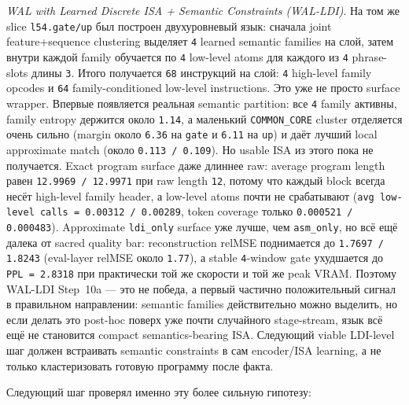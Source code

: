 \begin{itemize}[leftmargin=1.5em]
\emph{WAL with Learned Discrete ISA + Semantic Constraints (WAL-LDI)}.
На том же slice \texttt{l54.gate/up} был построен двухуровневый язык:
сначала joint feature+sequence clustering выделяет \texttt{4} learned semantic
families на слой, затем внутри каждой family обучается по \texttt{4} low-level
atoms для каждого из \texttt{4} phrase-slots длины \texttt{3}. Итого получается
\texttt{68} инструкций на слой: \texttt{4} high-level family opcodes и
\texttt{64} family-conditioned low-level instructions. Это уже не просто
surface wrapper. Впервые появляется реальная semantic partition: все
\texttt{4} family активны, family entropy держится около \texttt{1.14}, а
маленький \texttt{COMMON\_CORE} cluster отделяется очень сильно
(margin около \texttt{6.36} на \texttt{gate} и \texttt{6.11} на \texttt{up})
и даёт лучший local approximate match (около \texttt{0.113 / 0.109}).
Но usable ISA из этого пока не получается. Exact program surface даже длиннее
raw: average program length равен \texttt{12.9969 / 12.9971} при raw length
\texttt{12}, потому что каждый block всегда несёт high-level family header,
а low-level atoms почти не срабатывают
(\texttt{avg low-level calls = 0.00312 / 0.00289}, token coverage только
\texttt{0.000521 / 0.000483}). Approximate \texttt{ldi\_only} surface уже
лучше, чем \texttt{asm\_only}, но всё ещё далека от sacred quality bar:
reconstruction relMSE поднимается до \texttt{1.7697 / 1.8243}
(eval-layer relMSE около \texttt{1.77}), а stable \texttt{4}-window gate
ухудшается до \texttt{PPL = 2.8318} при практически той же скорости и той же
peak VRAM. Поэтому WAL-LDI Step~10a --- это не победа, а первый частично
положительный сигнал в правильном направлении: semantic families действительно
можно выделить, но если делать это post-hoc поверх уже почти случайного
stage-stream, язык всё ещё не становится compact semantics-bearing ISA.
Следующий viable LDI-level шаг должен встраивать semantic constraints в сам
encoder/ISA learning, а не только кластеризовать готовую программу после факта.

Следующий шаг проверял именно эту более сильную гипотезу:


\end{itemize}
